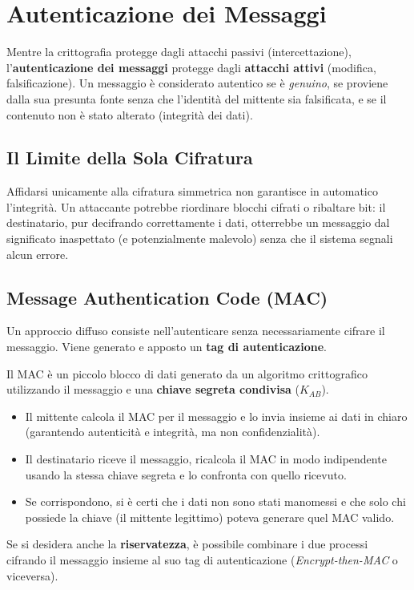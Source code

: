 \section{Autenticazione dei Messaggi}
Mentre la crittografia protegge dagli attacchi passivi (intercettazione), l'\textbf{autenticazione dei messaggi} protegge dagli \textbf{attacchi attivi} (modifica, falsificazione). Un messaggio è considerato autentico se è \textit{genuino}, se proviene dalla sua presunta fonte senza che l'identità del mittente sia falsificata, e se il contenuto non è stato alterato (integrità dei dati).

\subsection{Il Limite della Sola Cifratura}
Affidarsi unicamente alla cifratura simmetrica non garantisce in automatico l'integrità. Un attaccante potrebbe riordinare blocchi cifrati o ribaltare bit: il destinatario, pur decifrando correttamente i dati, otterrebbe un messaggio dal significato inaspettato (e potenzialmente malevolo) senza che il sistema segnali alcun errore. 

\subsection{Message Authentication Code (MAC)}
Un approccio diffuso consiste nell'autenticare senza necessariamente cifrare il messaggio. Viene generato e apposto un \textbf{tag di autenticazione}.

\begin{defbox}
Il MAC è un piccolo blocco di dati generato da un algoritmo crittografico utilizzando il messaggio e una \textbf{chiave segreta condivisa} ($K_{AB}$).
\begin{itemize}
    \item Il mittente calcola il MAC per il messaggio e lo invia insieme ai dati in chiaro (garantendo autenticità e integrità, ma non confidenzialità).
    \item Il destinatario riceve il messaggio, ricalcola il MAC in modo indipendente usando la stessa chiave segreta e lo confronta con quello ricevuto.
    \item Se corrispondono, si è certi che i dati non sono stati manomessi e che solo chi possiede la chiave (il mittente legittimo) poteva generare quel MAC valido.
\end{itemize}
Se si desidera anche la \textbf{riservatezza}, è possibile combinare i due processi cifrando il messaggio insieme al suo tag di autenticazione (\textit{Encrypt-then-MAC} o viceversa).
\end{defbox}

